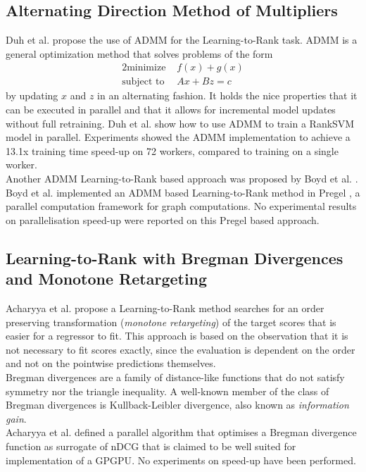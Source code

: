 \subsection{Alternating Direction Method of Multipliers}
Duh et al. \cite{Duh2011} propose the use of \ac{ADMM} for the Learning-to-Rank task. \ac{ADMM} is a general optimization method that solves problems of the form
\begin{alignat*}{2}
\text{minimize }   &  f(x) + g(x) \\
\text{subject to } &  Ax + Bz = c
\end{alignat*}
by updating $x$ and $z$ in an alternating fashion. It holds the nice properties that it can be executed in parallel and that it allows for incremental model updates without full retraining. Duh et al. \cite{Duh2011} show how to use \ac{ADMM} to train a RankSVM \cite{Herbrich1999, Joachims2002} model in parallel. Experiments showed the \ac{ADMM} implementation to achieve a 13.1x training time speed-up on 72 workers, compared to training on a single worker.\\

Another \ac{ADMM} Learning-to-Rank based approach was proposed by Boyd et al. \cite{Boyd2012}. Boyd et al. \cite{Boyd2012} implemented an \ac{ADMM} based Learning-to-Rank method in Pregel \cite{Malewicz2010}, a parallel computation framework for graph computations. No experimental results on parallelisation speed-up were reported on this Pregel based approach.
\subsection{Learning-to-Rank with Bregman Divergences and Monotone Retargeting}
Acharyya et al. \cite{Acharyya2012} propose a Learning-to-Rank method searches for an order preserving transformation (\emph{monotone retargeting}) of the target scores that is easier for a regressor to fit. This approach is based on the observation that it is not necessary to fit scores exactly, since the evaluation is dependent on the order and not on the pointwise predictions themselves.\\

Bregman divergences are a family of distance-like functions that do not satisfy symmetry nor the triangle inequality. A well-known member of the class of Bregman divergences is Kullback-Leibler divergence, also known as \emph{information gain}.\\

Acharyya et al. \cite{Acharyya2012} defined a parallel algorithm that optimises a Bregman divergence function as surrogate of \ac{nDCG} that is claimed to be well suited for implementation of a \ac{GPGPU}. No experiments on speed-up have been performed.
